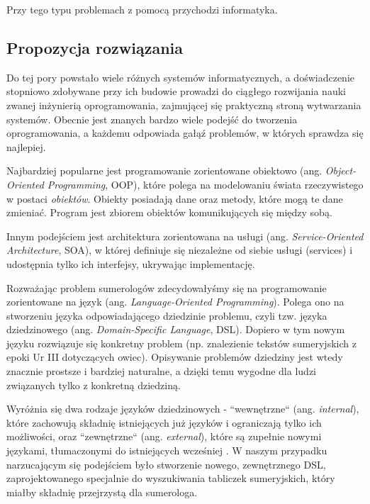 Przy tego typu problemach z pomocą przychodzi informatyka. 

\subsection*{Propozycja rozwiązania}
Do tej pory powstało wiele różnych systemów informatycznych, a doświadczenie stopniowo zdobywane przy ich budowie prowadzi do 
ciągłego rozwijania nauki zwanej inżynierią oprogramowania, zajmującej się praktyczną stroną wytwarzania systemów. Obecnie jest 
znanych bardzo wiele podejść do tworzenia oprogramowania, a każdemu odpowiada gałąź problemów, w których sprawdza się najlepiej. 

Najbardziej popularne jest programowanie zorientowane obiektowo (ang. \emph{Object-Oriented Programming}, OOP), które polega na modelowaniu 
świata rzeczywistego w postaci \textit{obiektów}. Obiekty posiadają dane oraz metody, które mogą te dane zmieniać. Program jest zbiorem 
obiektów komunikujących się między sobą. 

Innym podejściem jest architektura zorientowana na usługi (ang. \emph{Service-Oriented Architecture}, SOA), w której definiuje się 
niezależne od siebie usługi (services) i udostępnia tylko ich interfejsy, ukrywając implementację.

Rozważając problem sumerologów zdecydowałyśmy się na programowanie zorientowane na język (ang. \emph{Language-Oriented Programming}). 
Polega ono na stworzeniu języka odpowiadającego dziedzinie problemu, czyli tzw. języka dziedzinowego (ang. \emph{Domain-Specific Language},
 DSL). Dopiero w tym nowym języku rozwiązuje się konkretny problem (np. znalezienie tekstów sumeryjskich z epoki Ur III dotyczących owiec). 
Opisywanie problemów dziedziny jest wtedy znacznie prostsze i bardziej naturalne, a dzięki temu wygodne dla ludzi związanych tylko z 
konkretną dziedziną. 

Wyróżnia się dwa rodzaje języków dziedzinowych - ``wewnętrzne`` (ang. \emph{internal}), które zachowują składnię istniejących już języków 
i ograniczają tylko ich możliwości, oraz ``zewnętrzne`` (ang. \emph{external}), które są zupełnie nowymi językami, tłumaczonymi do 
istniejących wcześniej \cite{fowler}. W naszym przypadku narzucającym się podejściem było stworzenie nowego, zewnętrznego DSL, zaprojektowanego 
specjalnie do wyszukiwania tabliczek sumeryjskich, który miałby składnię przejrzystą dla sumerologa. 

